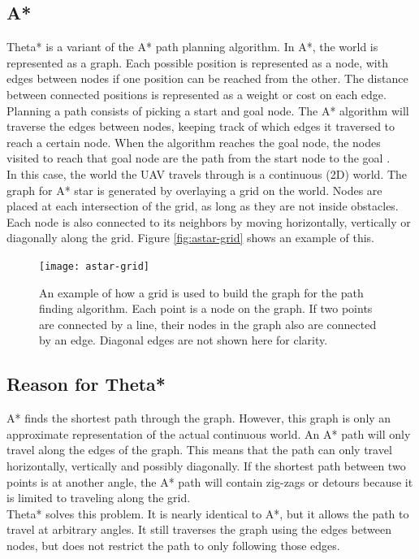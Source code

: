\subsection{A*}
Theta* is a variant of the A* path planning algorithm. In A*, the world is represented as a graph. Each possible position is represented as a node, with edges between nodes if one position can be reached from the other. The distance between connected positions is represented as a weight or cost on each edge. \\
Planning a path consists of picking a start and goal node. The A* algorithm will traverse the edges between nodes, keeping track of which edges it traversed to reach a certain node. When the algorithm reaches the goal node, the nodes visited to reach that goal node are the path from the start node to the goal . \\
In this case, the world the UAV travels through is a continuous (2D) world. The graph for A* star is generated by overlaying a grid on the world. Nodes are placed at each intersection of the grid, as long as they are not inside obstacles. Each node is also connected to its neighbors by moving horizontally, vertically or diagonally along the grid. Figure \ref{fig:astar-grid} shows an example of this.
\begin{figure}
\centering
\texttt{[image: astar-grid]}
\caption{An example of how a grid is used to build the graph for the path finding algorithm. Each point is a node on the graph. If two points are connected by a line, their nodes in the graph also are connected by an edge. Diagonal edges are not shown here for clarity.}
\label{figure:astar-grid}
\end{figure}

\subsection{Reason for Theta*}
A* finds the shortest path through the graph. However, this graph is only an approximate representation of the actual continuous world. An A* path will only travel along the edges of the graph. This means that the path can only travel horizontally, vertically and possibly diagonally. If the shortest path between two points is at another angle, the A* path will contain zig-zags or detours because it is limited to traveling along the grid. \\
Theta* solves this problem. It is nearly identical to A*, but it allows the path to travel at arbitrary angles. It still traverses the graph using the edges between nodes, but does not restrict the path to only following those edges.

